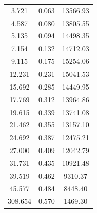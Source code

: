 \documentclass[UTF8]{article}
\theoremstyle{MyLineTheoremStyle} %
\theoremstyle{MyBlockTheoremStyle} %
\theoremstyle{MySubsubsectionStyle} %
\begin{document}
\begin{center}
\begin{minipage}{0.4\columnwidth}
\begin{table}[H]
\begin{tabular}{ccc}
3.721	& 0.063 & 13566.93 \\
4.587	& 0.080 & 13805.55 \\
5.135	& 0.094 & 14498.35 \\
7.154	& 0.132 & 14712.03 \\
9.115	& 0.175 & 15254.06 \\
12.231  & 0.231 & 15041.53 \\
15.692  & 0.285 & 14449.95 \\
17.769  & 0.312 & 13964.86 \\
19.615  & 0.339 & 13741.08 \\
21.462  & 0.355 & 13157.10 \\
24.692  & 0.387 & 12475.21 \\
27.000  & 0.409 & 12042.79 \\
31.731  & 0.435 & 10921.48 \\
39.519  & 0.462 & 9310.37 \\
45.577  & 0.484 & 8448.40 \\
308.654 & 0.570 & 1469.30 \\
\bottomrule
\end{tabular}
\end{table}
\end{minipage}
\begin{minipage}{0.28\columnwidth}
\begin{figure}[H]\centering

\end{figure}
\end{minipage}
\end{center}
\end{document}
